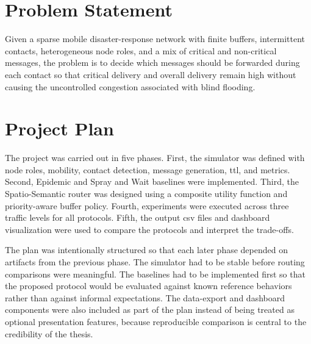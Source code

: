 \section{Problem Statement}
Given a sparse mobile disaster-response network with finite buffers, intermittent contacts, heterogeneous node roles, and a mix of critical and non-critical messages, the problem is to decide which messages should be forwarded during each contact so that critical delivery and overall delivery remain high without causing the uncontrolled congestion associated with blind flooding.

\section{Project Plan}
The project was carried out in five phases. First, the simulator was defined with node roles, mobility, contact detection, message generation, \ac{ttl}, and metrics. Second, Epidemic and Spray and Wait baselines were implemented. Third, the Spatio-Semantic router was designed using a composite utility function and priority-aware buffer policy. Fourth, experiments were executed across three traffic levels for all protocols. Fifth, the output \ac{csv} files and dashboard visualization were used to compare the protocols and interpret the trade-offs.

The plan was intentionally structured so that each later phase depended on artifacts from the previous phase. The simulator had to be stable before routing comparisons were meaningful. The baselines had to be implemented first so that the proposed protocol would be evaluated against known reference behaviors rather than against informal expectations. The data-export and dashboard components were also included as part of the plan instead of being treated as optional presentation features, because reproducible comparison is central to the credibility of the thesis.

\begin{table}[h!]
	\centering
	\caption{Protocol comparison focus}
	\renewcommand{\arraystretch}{1.3}
	\label{tab:protocol_focus}
\end{table}
